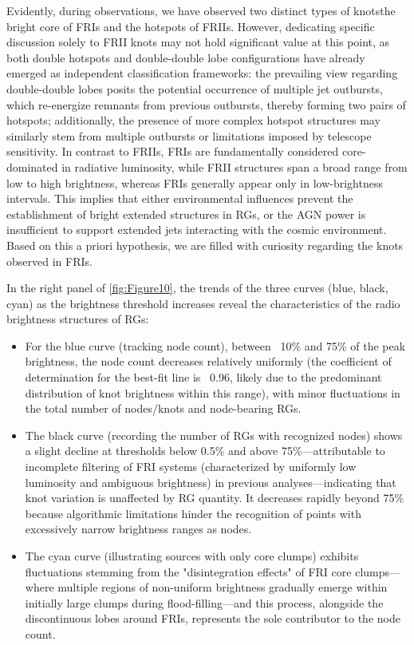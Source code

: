 \documentclass{aa}
\begin{document}
Evidently, during observations, we have observed two distinct types of knots\textemdash the bright core of FRIs and the hotspots of FRIIs. However, dedicating specific discussion solely to FRII knots may not hold significant value at this point, as both double hotspots and double-double lobe configurations have already emerged as independent classification frameworks: the prevailing view regarding double-double lobes posits the potential occurrence of multiple jet outbursts, which re-energize remnants from previous outbursts, thereby forming two pairs of hotspots; additionally, the presence of more complex hotspot structures may similarly stem from multiple outbursts or limitations imposed by telescope sensitivity. In contrast to FRIIs, FRIs are fundamentally considered core-dominated in radiative luminosity, while FRII structures span a broad range from low to high brightness, whereas FRIs generally appear only in low-brightness intervals. This implies that either environmental influences prevent the establishment of bright extended structures in RGs, or the AGN power is insufficient to support extended jets interacting with the cosmic environment. Based on this a priori hypothesis, we are filled with curiosity regarding the knots observed in FRIs.


In the right panel of \autoref{fig:Figure10}, the trends of the three curves (blue, black, cyan) as the brightness threshold increases reveal the characteristics of the radio brightness structures of RGs:
\begin{itemize}[label=•]
    
    \item For the blue curve (tracking node count), between ~10\% and 75\% of the peak brightness, the node count decreases relatively uniformly (the coefficient of determination for the best-fit line is ~0.96, likely due to the predominant distribution of knot brightness within this range), with minor fluctuations in the total number of nodes/knots and node-bearing RGs.
    
    \item The black curve (recording the number of RGs with recognized nodes) shows a slight decline at thresholds below 0.5\% and above 75\%—attributable to incomplete filtering of FRI systems (characterized by uniformly low luminosity and ambiguous brightness) in previous analyses—indicating that knot variation is unaffected by RG quantity. It decreases rapidly beyond 75\% because algorithmic limitations hinder the recognition of points with excessively narrow brightness ranges as nodes.
    
    \item The cyan curve (illustrating sources with only core clumps) exhibits fluctuations stemming from the "disintegration effects" of FRI core clumps—where multiple regions of non-uniform brightness gradually emerge within initially large clumps during flood-filling—and this process, alongside the discontinuous lobes around FRIs, represents the sole contributor to the node count.

\end{itemize}
\end{document}

